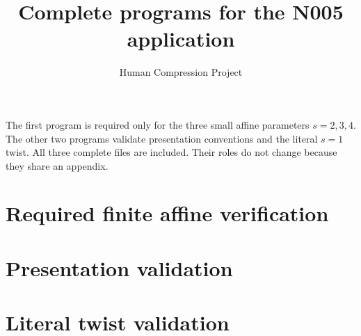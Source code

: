 
\usepackage{fvextra}
\title{Complete programs for the N005 application}\author{Human Compression Project}\date{}
\maketitle
The first program is required only for the three small affine parameters $s=2,3,4$. The other two programs validate presentation conventions and the literal $s=1$ twist. All three complete files are included. Their roles do not change because they share an appendix.
\section{Required finite affine verification}
\section{Presentation validation}
\section{Literal twist validation}

